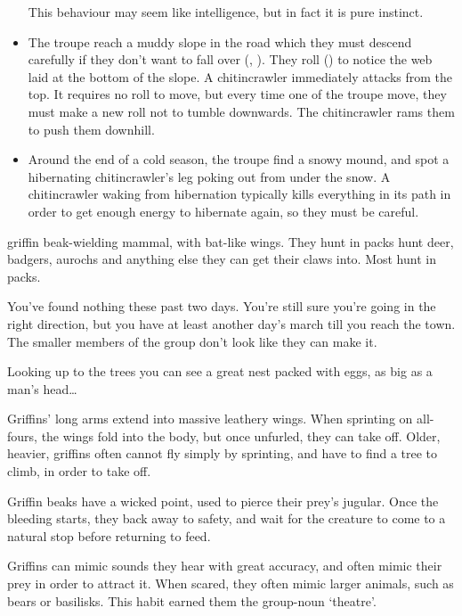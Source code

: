 \begin{multicols}{2}
\begin{itemize}
  This behaviour may seem like intelligence, but in fact it is pure instinct.
  \item
  The troupe reach a muddy slope in the road which they must descend carefully if they don't want to fall over (, \tn[7]).
  They roll  (\tn[8]) to notice the web laid at the bottom of the slope.
  A chitincrawler immediately attacks from the top.
  It requires no roll to move, but every time one of the troupe move, they must make a new roll not to tumble downwards.
  The chitincrawler rams them to push them downhill.
  \item
  Around the end of a cold season, the troupe find a snowy mound, and spot a hibernating chitincrawler's leg poking out from under the snow.
  A chitincrawler waking from hibernation typically kills everything in its path in order to get enough energy to hibernate again, so they must be careful.
\end{itemize}

  {griffin}%
  {beak-wielding mammal, with bat-like wings. They hunt in packs}%
hunt deer, badgers, aurochs and anything else they can get their claws into.
Most hunt in packs.

\begin{boxtext}
  You've found nothing these past two days.
  You're still sure you're going in the right direction, but you have at least another day's march till you reach the town.
  The smaller members of the group don't look like they can make it.

  Looking up to the trees you can see a great nest packed with eggs, as big as a man's head\ldots
\end{boxtext}

Griffins' long arms extend into massive leathery wings.
When sprinting on all-fours, the wings fold into the body, but once unfurled, they can take off.
Older, heavier, griffins often cannot fly simply by sprinting, and have to find a tree to climb, in order to take off.

Griffin beaks have a wicked point, used to pierce their prey's jugular.
Once the bleeding starts, they back away to safety, and wait for the creature to come to a natural stop before returning to feed.

Griffins can mimic sounds they hear with great accuracy, and often mimic their prey in order to attract it.
When scared, they often mimic larger animals, such as bears or basilisks.
This habit earned them the group-noun `theatre'.


\end{multicols}
